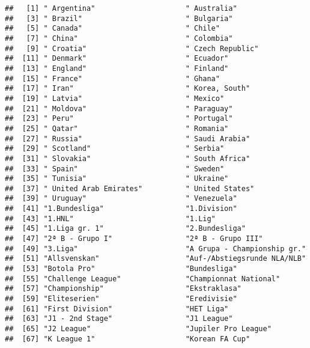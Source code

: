 \documentclass[]{article}
\begin{document}
\begin{verbatim}
##   [1] " Argentina"                     " Australia"                    
##   [3] " Brazil"                        " Bulgaria"                     
##   [5] " Canada"                        " Chile"                        
##   [7] " China"                         " Colombia"                     
##   [9] " Croatia"                       " Czech Republic"               
##  [11] " Denmark"                       " Ecuador"                      
##  [13] " England"                       " Finland"                      
##  [15] " France"                        " Ghana"                        
##  [17] " Iran"                          " Korea, South"                 
##  [19] " Latvia"                        " Mexico"                       
##  [21] " Moldova"                       " Paraguay"                     
##  [23] " Peru"                          " Portugal"                     
##  [25] " Qatar"                         " Romania"                      
##  [27] " Russia"                        " Saudi Arabia"                 
##  [29] " Scotland"                      " Serbia"                       
##  [31] " Slovakia"                      " South Africa"                 
##  [33] " Spain"                         " Sweden"                       
##  [35] " Tunisia"                       " Ukraine"                      
##  [37] " United Arab Emirates"          " United States"                
##  [39] " Uruguay"                       " Venezuela"                    
##  [41] "1.Bundesliga"                   "1.Division"                    
##  [43] "1.HNL"                          "1.Lig"                         
##  [45] "1.Liga gr. 1"                   "2.Bundesliga"                  
##  [47] "2ª B - Grupo I"                 "2ª B - Grupo III"              
##  [49] "3.Liga"                         "A Grupa - Championship gr."    
##  [51] "Allsvenskan"                    "Auf-/Abstiegsrunde NLA/NLB"    
##  [53] "Botola Pro"                     "Bundesliga"                    
##  [55] "Challenge League"               "Championnat National"          
##  [57] "Championship"                   "Ekstraklasa"                   
##  [59] "Eliteserien"                    "Eredivisie"                    
##  [61] "First Division"                 "HET Liga"                      
##  [63] "J1 - 2nd Stage"                 "J1 League"                     
##  [65] "J2 League"                      "Jupiler Pro League"            
##  [67] "K League 1"                     "Korean FA Cup"                 

\end{verbatim}
\end{document}
